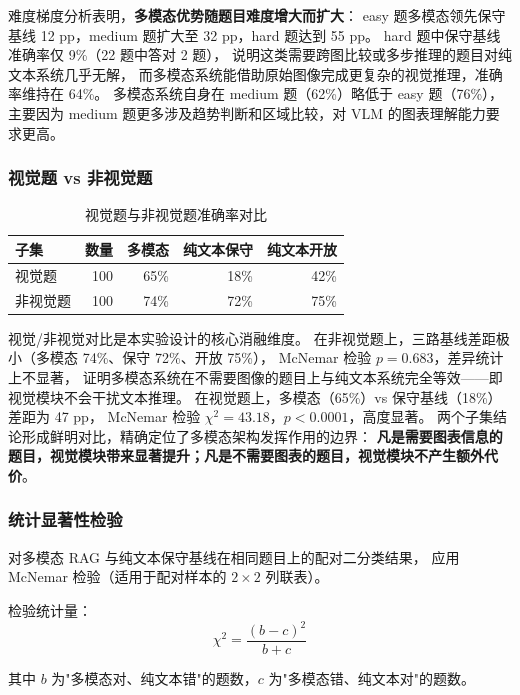 ﻿\documentclass[UTF8, heading=true]{ctexart}
\begin{document}
难度梯度分析表明，\textbf{多模态优势随题目难度增大而扩大}：
easy 题多模态领先保守基线 12 pp，medium 题扩大至 32 pp，hard 题达到 55 pp。
hard 题中保守基线准确率仅 9\%（22 题中答对 2 题），
说明这类需要跨图比较或多步推理的题目对纯文本系统几乎无解，
而多模态系统能借助原始图像完成更复杂的视觉推理，准确率维持在 64\%。
多模态系统自身在 medium 题（62\%）略低于 easy 题（76\%），
主要因为 medium 题更多涉及趋势判断和区域比较，对 VLM 的图表理解能力要求更高。

\subsubsection{视觉题 vs 非视觉题}

\begin{table}[H]
\centering
\caption{视觉题与非视觉题准确率对比}
\begin{tabular}{lrrrr}
\toprule
\textbf{子集} & \textbf{数量} & \textbf{多模态} & \textbf{纯文本保守} & \textbf{纯文本开放} \\
\midrule
视觉题 & 100 & 65\% & 18\% & 42\% \\
非视觉题 & 100 & 74\% & 72\% & 75\% \\
\bottomrule
\end{tabular}
\label{tab:visual}
\end{table}

视觉/非视觉对比是本实验设计的核心消融维度。
在非视觉题上，三路基线差距极小（多模态 74\%、保守 72\%、开放 75\%），
McNemar 检验 $p=0.683$，差异统计上不显著，
证明多模态系统在不需要图像的题目上与纯文本系统完全等效——即视觉模块不会干扰文本推理。
在视觉题上，多模态（65\%）vs 保守基线（18\%）差距为 47 pp，
McNemar 检验 $\chi^2=43.18$，$p<0.0001$，高度显著。
两个子集结论形成鲜明对比，精确定位了多模态架构发挥作用的边界：
\textbf{凡是需要图表信息的题目，视觉模块带来显著提升；凡是不需要图表的题目，视觉模块不产生额外代价}。

\subsubsection{统计显著性检验}

对多模态 RAG 与纯文本保守基线在相同题目上的配对二分类结果，
应用 McNemar 检验（适用于配对样本的 $2\times2$ 列联表）。

检验统计量：
\begin{equation}
    \chi^2 = \frac{(b - c)^2}{b + c}
\end{equation}

其中 $b$ 为"多模态对、纯文本错"的题数，$c$ 为"多模态错、纯文本对"的题数。
\end{document}
